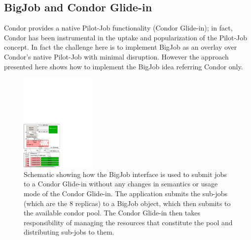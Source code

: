\documentclass[conference,final]{IEEEtran}
\newcommand{\up}{\vspace*{-1em}}
\newcommand{\alnote}[1]{ {\textcolor{blue} { ***AL: #1 }}}
\newcommand{\jhanote}[1]{ {\textcolor{red} { ***SJ: #1 }}}
\newcommand{\alnote}[1]{}
\newcommand{\jhanote}[1]{}
\begin{document}



\subsection{BigJob and Condor Glide-in} 
\up


Condor provides a native Pilot-Job functionality (Condor Glide-in); in
fact, Condor has been instrumental in the uptake and popularization of
the Pilot-Job concept.  In fact the challenge here is to implement
BigJob as an overlay over Condor's native Pilot-Job with minimal
disruption. However the approach presented here shows how to
implement the BigJob idea referring Condor only.

\begin{figure}[!ht]
 \begin{center}
     \includegraphics[width=0.33\textwidth]{figures/bigjob_condor}
 \end{center}
 \caption{\small Schematic showing how the BigJob interface is used to
   submit jobs to a Condor Glide-in without any changes in semantics
   or usage mode of the Condor Glide-in. The application submits the
   sub-jobs (which are the 8 replicas) to a BigJob object, which then
   submits to the available condor pool. The Condor Glide-in then
   takes responsibility of managing the resources that constitute the
   pool and distributing sub-jobs to them.\up} \label{fig:saga-condor}
\end{figure}
\end{document}
